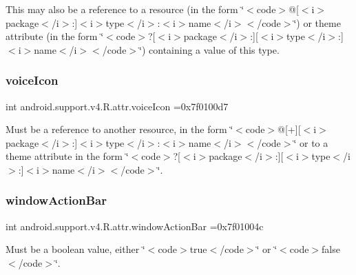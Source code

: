 This may also be a reference to a resource (in the form \char`\"{}$<$code$>$@\mbox{[}$<$i$>$package$<$/i$>$\+:\mbox{]}$<$i$>$type$<$/i$>$\+:$<$i$>$name$<$/i$>$$<$/code$>$\char`\"{}) or theme attribute (in the form \char`\"{}$<$code$>$?\mbox{[}$<$i$>$package$<$/i$>$\+:\mbox{]}\mbox{[}$<$i$>$type$<$/i$>$\+:\mbox{]}$<$i$>$name$<$/i$>$$<$/code$>$\char`\"{}) containing a value of this type. \mbox{\label{classandroid_1_1support_1_1v4_1_1R_1_1attr_ad22fdc68658d936869e5756cda1b2d6f}} 
\subsubsection{\texorpdfstring{voice\+Icon}{voiceIcon}}
{\footnotesize\ttfamily int android.\+support.\+v4.\+R.\+attr.\+voice\+Icon =0x7f0100d7\hspace{0.3cm}{\ttfamily [static]}}

Must be a reference to another resource, in the form \char`\"{}$<$code$>$@\mbox{[}+\mbox{]}\mbox{[}$<$i$>$package$<$/i$>$\+:\mbox{]}$<$i$>$type$<$/i$>$\+:$<$i$>$name$<$/i$>$$<$/code$>$\char`\"{} or to a theme attribute in the form \char`\"{}$<$code$>$?\mbox{[}$<$i$>$package$<$/i$>$\+:\mbox{]}\mbox{[}$<$i$>$type$<$/i$>$\+:\mbox{]}$<$i$>$name$<$/i$>$$<$/code$>$\char`\"{}. \mbox{\label{classandroid_1_1support_1_1v4_1_1R_1_1attr_a353d40cb93c69197c58c3f4b7364b41f}} 
\subsubsection{\texorpdfstring{window\+Action\+Bar}{windowActionBar}}
{\footnotesize\ttfamily int android.\+support.\+v4.\+R.\+attr.\+window\+Action\+Bar =0x7f01004c\hspace{0.3cm}{\ttfamily [static]}}

Must be a boolean value, either \char`\"{}$<$code$>$true$<$/code$>$\char`\"{} or \char`\"{}$<$code$>$false$<$/code$>$\char`\"{}. 

